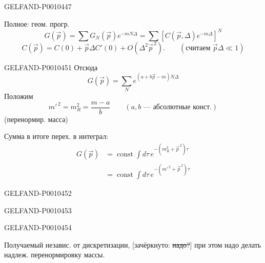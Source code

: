 \begin{GelfandAdjacentEvidence}{GELFAND-P001044}{7}


Полное: геом. прогр.
\begin{equation*}
G(\vec{p})=\sum G_N(\vec{p})e^{-mN\Delta}
=\sum[C(\vec{p},\Delta)e^{-m\Delta}]^N
\tag{19}
\end{equation*}
\[
C(\vec{p})=C(0)+\vec{p}\Delta C'(0)+O(\Delta^2\vec{p}^{\,2}).
\qquad(\text{считаем }\vec{p}\Delta\ll1)
\]
\end{GelfandAdjacentEvidence}



\begin{GelfandAdjacentEvidence}{GELFAND-P001045}{1}
Отсюда
\begin{equation*}
G(\vec{p})=\sum_N e^{(a+b\vec{p}-m)N\Delta}
\tag{20}
\end{equation*}
Положим
\[
m'^{\,2}=m_R^2=\frac{m-a}{b}\qquad(a,b\text{ — абсолютные конст.})
\]
(перенормир. масса)

Сумма в итоге перех. в интеграл:
\begin{equation*}
\begin{aligned}
G(\vec{p})&=\operatorname{const}\int d\tau\,e^{-(m_R^2+\vec{p}^{\,2})\tau}\\
&=\operatorname{const}\int d\tau\,e^{-(m'^{\,2}+\vec{p}^{\,2})\tau}
\end{aligned}
\tag{21}
\end{equation*}
\end{GelfandAdjacentEvidence}
\begin{GelfandAdjacentEvidence}{GELFAND-P001045}{2}

\end{GelfandAdjacentEvidence}
\begin{GelfandAdjacentEvidence}{GELFAND-P001045}{3}

\end{GelfandAdjacentEvidence}
\begin{GelfandAdjacentEvidence}{GELFAND-P001045}{4}


Получаемый независ. от дискретизации,
[зачёркнуто: \sout{надо?}]
при этом надо делать надлеж. перенормировку массы.
\end{GelfandAdjacentEvidence}
